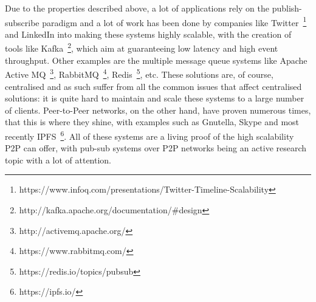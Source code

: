 Due to the properties described above, a lot of applications rely on the
publish-subscribe paradigm and a lot of work has been done by companies
like Twitter~\footnote{https://www.infoq.com/presentations/Twitter-Timeline-Scalability}
and LinkedIn into making these systems highly scalable, with the
creation of tools like Kafka~\footnote{http://kafka.apache.org/documentation/\#design}, which aim at
guaranteeing low latency and high event throughput. Other examples are
the multiple message queue systems like Apache Active MQ~\footnote{http://activemq.apache.org/},
RabbitMQ~\footnote{https://www.rabbitmq.com/}, Redis~\footnote{https://redis.io/topics/pubsub}, etc.
These solutions are, of course, centralised and as such suffer from all the common issues that
affect centralised solutions: it is quite hard to maintain and scale
these systems to a large number of clients. Peer-to-Peer networks, on the
other hand, have proven numerous times, that this is where they shine,
with examples such as Gnutella, Skype and most recently IPFS~\footnote{https://ipfs.io/}.
All of these systems are a living proof of the high
scalability P2P can offer, with pub-sub systems over P2P networks being
an active research topic with a lot of attention.

